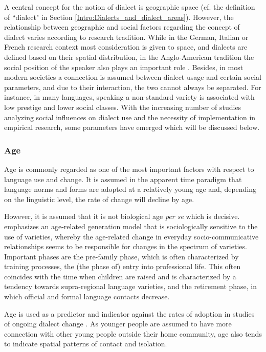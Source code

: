 \documentclass[output=paper]{langscibook}
\begin{document}
A central concept for the notion of dialect is geographic space (cf. the definition of “dialect" in Section \ref{Intro:Dialects_and_dialect_areas}). However, the relationship between geographic and social factors regarding the concept of dialect varies according to research tradition. While in the German, Italian or French research context most consideration is given to space, and dialects are defined based on their spatial distribution, in the Anglo-American tradition the social position of the speaker also plays an important role \parencite[cf.][1436f.]{Mattheier2005}. Besides, in most modern societies a connection is assumed between dialect usage and certain social parameters, and due to their interaction, the two cannot always be separated. For instance, in many languages, speaking a non-standard variety is associated with low prestige and lower social classes.
With the increasing number of studies analyzing social influences on dialect use and the necessity of implementation in empirical research, some parameters have emerged which will be discussed below. 

\subsubsection{Age}

Age is commonly regarded as one of the most important factors with respect to language use and change. It is assumed in the apparent time paradigm \parencite[cf.][]{Bailey2002} that language norms and forms are adopted at a relatively young age and, depending on the linguistic level, the rate of change will decline by age.

However, it is assumed that it is not biological age \textit{per se} which is decisive. \citet{Mattheier1994} emphasizes an age-related generation model that is sociologically sensitive to the use of varieties, whereby the age-related change in everyday socio-communicative relationships seems to be responsible for changes in the spectrum of varieties. Important phases are the pre-family phase, which is often characterized by training processes, the (the phase of) entry into professional life. This often coincides with the time when children are raised and is characterized by a tendency towards supra-regional language varieties, and the retirement phase, in which official and formal language contacts decrease.

Age is used as a predictor and indicator against the rates of adoption in studies of ongoing dialect change \parencite[e.g.,][]{Willis2017}. As younger people are assumed to have more connection with other young people outside their home community, age also tends to indicate spatial patterns of contact and isolation.
\end{document}
